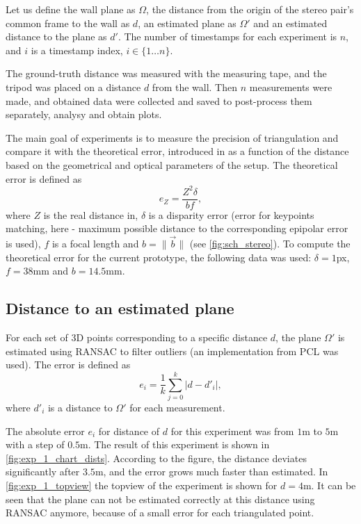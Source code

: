 Let us define the wall plane as $\Omega$, the distance from the origin of the stereo pair's common frame to the wall as $d$, an estimated plane as $\Omega'$ and an estimated distance to the plane as $d'$.
The number of timestamps for each experiment is $n$, and $i$ is a timestamp index, $i \in \{1 \dots n\}$.

The ground-truth distance was measured with the measuring tape, and the tripod was placed on a distance $d$ from the wall. 
Then $n$ measurements were made, and obtained data were collected and saved to post-process them separately, analysy and obtain plots.

The main goal of experiments is to measure the precision of triangulation and compare it with the theoretical error, introduced in \cite{cv_theoretical_error} as a function of the distance based on the geometrical and optical parameters of the setup.
The theoretical error is defined as
\begin{equation}
    e_Z = \frac{Z^2 \delta}{bf},
\end{equation}
where $Z$ is the real distance in, $\delta$ is a disparity error (error for keypoints matching, here - maximum possible distance to the corresponding epipolar error is used), $f$ is a focal length and $b = \lVert \vec{b} \rVert$ (see \autoref{fig:sch_stereo}).
To compute the theoretical error for the current prototype, the following data was used: $\delta=1$px, $f=38$mm and $b=14.5$mm.

\subsection{Distance to an estimated plane}
\label{sec:exp1}
For each set of 3D points corresponding to a specific distance $d$, the plane $\Omega'$ is estimated using RANSAC to filter outliers (an implementation from PCL was used).
The error is defined as
\begin{equation}
    e_i = \frac{1}{k}\sum_{j=0}^{k}{|d - d'_i|},
\end{equation}
where $d'_i$ is a distance to $\Omega'$ for each measurement.

The absolute error $e_i$ for distance of $d$ for this experiment was from $1$m to $5$m with a step of $0.5$m.
The result of this experiment is shown in \autoref{fig:exp_1_chart_dists}.
According to the figure, the distance deviates significantly after $3.5$m, and the error grows much faster than estimated.
In \autoref{fig:exp_1_topview} the topview of the experiment is shown for $d=4$m.
It can be seen that the plane can not be estimated correctly at this distance using RANSAC anymore, because of a small error for each triangulated point.

